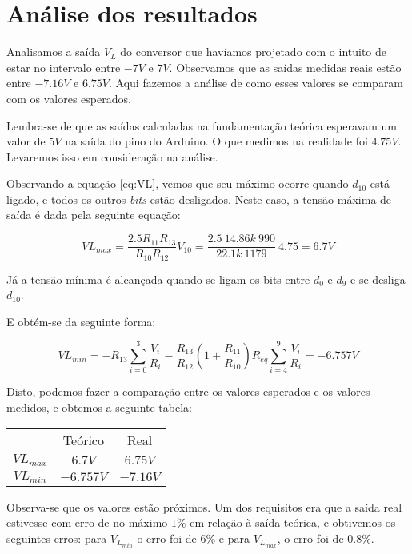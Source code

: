 \section{Análise dos resultados}

Analisamos a saída $V_L$ do conversor que havíamos projetado com o intuito de estar no intervalo entre $-7V$ e $7V$. Observamos que as saídas medidas reais estão entre $-7.16V$ e $6.75V$. Aqui fazemos a análise de como esses valores se comparam com os valores esperados.

Lembra-se de que as saídas calculadas na fundamentação teórica esperavam um valor de $5V$ na saída do pino do Arduino. O que medimos na realidade foi $4.75V$. Levaremos isso em consideração na análise.

Observando a equação \ref{eq:VL}, vemos que seu máximo ocorre quando $d_{10}$ está ligado, e todos os outros \emph{bits} estão desligados. Neste caso, a tensão máxima de saída é dada pela seguinte equação:

\begin{equation}
    VL_{max} = \frac{2.5 R_{11} R_{13}}{R_{10} R_{12}} V_{10} = \frac{2.5 \ 14.86k \ 990}{22.1k \ 1179} \ 4.75 = 6.7V
\end{equation}

Já a tensão mínima é alcançada quando se ligam os bits entre $d_0$ e $d_9$ e se desliga $d_{10}$.

E obtém-se da seguinte forma:

\begin{equation}
    VL_{min} = - R_{13} \sum_{i=0}^{3} \frac{V_i}{R_i} - \frac{R_{13}}{R_{12}} \left( 1 + \frac{R_{11}}{R_{10} }\right)  R_{eq} \sum_{i=4}^{9} \frac{V_i}{R_i} = -6.757V
\end{equation}

Disto, podemos fazer a comparação entre os valores esperados e os valores medidos, e obtemos a seguinte tabela:

\begin{center}
    \begin{tabular}{c|c|c}
        \label{tab:comparacao}
                   & Teórico   & Real     \\
        $VL_{max}$ & $6.7V$    & $6.75V$  \\
        $VL_{min}$ & $-6.757V$ & $-7.16V$
    \end{tabular}
\end{center}

Observa-se que os valores estão próximos. Um dos requisitos era que a saída real estivesse com erro de no máximo $1\%$ em relação à saída teórica, e obtivemos os seguintes erros: para $V_{L_{min}}$ o erro foi de $6\%$ e para $V_{L_{max}}$, o erro foi de $0.8\%$.




